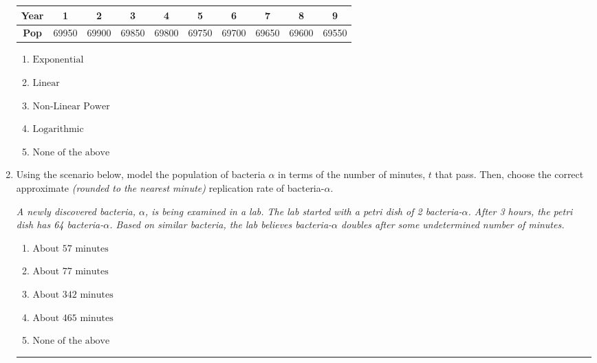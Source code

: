 \documentclass[14pt]{extbook}
\newcommand{\litem}[1]{\item#1\hspace*{-1cm}\rule{\textwidth}{0.4pt}}
\begin{document}
\begin{enumerate}
{\begin{tabular}{c|c|c|c|c|c|c|c|c|c}
\textbf{Year} &1 &2 &3 &4 &5 &6 &7 &8 &9\tabularnewline \hline
\textbf{Pop} &69950 &69900 &69850 &69800 &69750 &69700 &69650 &69600 &69550\end{tabular}\begin{enumerate}[label=\Alph*.]
\item \( \text{Exponential} \)
\item \( \text{Linear} \)
\item \( \text{Non-Linear Power} \)
\item \( \text{Logarithmic} \)
\item \( \text{None of the above} \)

\end{enumerate} }
\litem{
Using the scenario below, model the population of bacteria $\alpha$ in terms of the number of minutes, $t$ that pass. Then, choose the correct approximate \textit{(rounded to the nearest minute)} replication rate of bacteria-$\alpha$.
\begin{center}
    \textit{ A newly discovered bacteria, $\alpha$, is being examined in a lab. The lab started with a petri dish of 2 bacteria-$\alpha$. After 3 hours, the petri dish has 64 bacteria-$\alpha$. Based on similar bacteria, the lab believes bacteria-$\alpha$ doubles after some undetermined number of minutes. }
\end{center}
\begin{enumerate}[label=\Alph*.]
\item \( \text{About } 57 \text{ minutes} \)
\item \( \text{About } 77 \text{ minutes} \)
\item \( \text{About } 342 \text{ minutes} \)
\item \( \text{About } 465 \text{ minutes} \)
\item \( \text{None of the above} \)

\end{enumerate} }
\end{enumerate}
\end{document}
